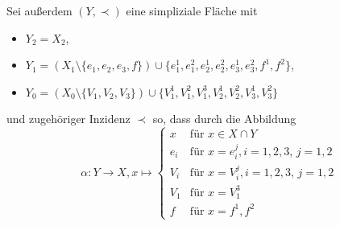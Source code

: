 \documentclass[12pt,titlepage]{article}
\begin{document}
Sei außerdem $(Y,\prec)$ eine simpliziale Fläche mit
\begin{itemize}
\item $Y_{2}=X_{2}$,
\item $Y_{1}=(X_{1} \setminus\{e_{1},e_2,e_3,f\} )\cup \{e_{1}^1,e_1^{2},e_{2}^1,e_2^{2},e_{3}^1,e_3^{2},f^1,f^2\}$,
\item $Y_{0}=(X_{0} \setminus\{V_{1},V_2,V_3\} )\cup \{V_{1}^1,V_1^{2},V_1^{3},V_{2}^1,V_2^{2},V_{3}^1,V_3^{2}\}$

\end{itemize}
und zugehöriger Inzidenz $\prec$ 
so, dass durch die Abbildung 
\[
\alpha: Y \to X ,x \mapsto 
\begin{cases}
x & \text{für } x\in X \cap Y\\
e_i & \text{für } x =e_i^j ,i=1,2,3,\,j=1,2\\
V_i &\text{für } x =V_i^j,i=1,2,3,\,j=1,2\\
V_1 &\text{für } x=V_1^3\\
f &\text{für } x=f^1,f^2 
\end{cases}
\]
\end{document}
